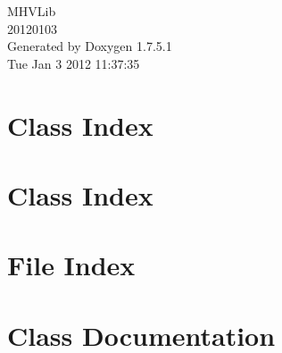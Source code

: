 \documentclass[a4paper]{book}
\begin{document}
\hypersetup{pageanchor=false,citecolor=blue}
\begin{titlepage}
\vspace*{7cm}
\begin{center}
{\Large \-M\-H\-V\-Lib \\[1ex]\large 20120103 }\\
\vspace*{1cm}
{\large \-Generated by Doxygen 1.7.5.1}\\
\vspace*{0.5cm}
{\small Tue Jan 3 2012 11:37:35}\\
\end{center}
\end{titlepage}
\clearemptydoublepage
{}
\tableofcontents
\clearemptydoublepage
{}
\hypersetup{pageanchor=true,citecolor=blue}
\chapter{\-Class \-Index}

\chapter{\-Class \-Index}

\chapter{\-File \-Index}

\chapter{\-Class \-Documentation}













































\end{document}
